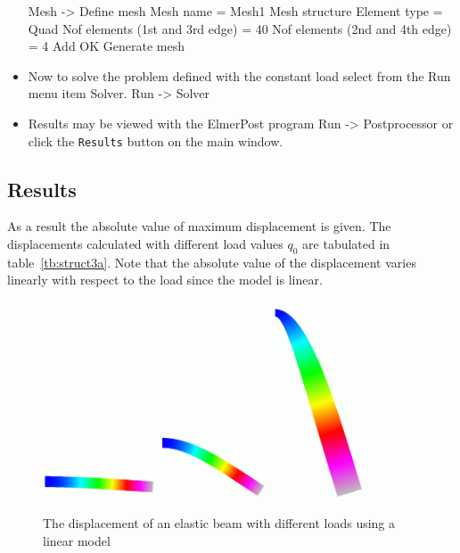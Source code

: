 \begin{itemize}
\ttbegin 
Mesh -> Define mesh 
Mesh name = Mesh1 
Mesh structure 
Element type = Quad 
Nof elements (1st and 3rd edge) = 40 
Nof elements (2nd and 4th edge) = 4 
Add 
OK 
Generate mesh 
\ttend
\item Now to solve the problem defined with the constant load select from 
the Run menu item Solver. 
\ttbegin
Run -> Solver 
\ttend
\item Results may be viewed with the ElmerPost program
\ttbegin
Run -> Postprocessor
\ttend
or click the {\tt Results} button on the main window.
\end{itemize}

\subsection*{Results}

As a result the absolute value of maximum displacement is given. The 
displacements calculated with different load values $q_0$ are tabulated in 
table~\ref{tb:struct3a}. Note that the absolute value of the
displacement varies linearly with respect to the load since the model
is linear.

\begin{figure}[h!]
\begin{center}
  \includegraphics[width=0.30\textwidth,angle=0]{respic1.png}
  \includegraphics[width=0.28\textwidth,angle=0]{respic2.png}
  \includegraphics[width=0.25\textwidth,angle=0]{respic3.png}
  \caption{The displacement of an elastic beam with different loads
using a linear model}
  \label{fig:elast_beam1}
\end{center}
\end{figure}

